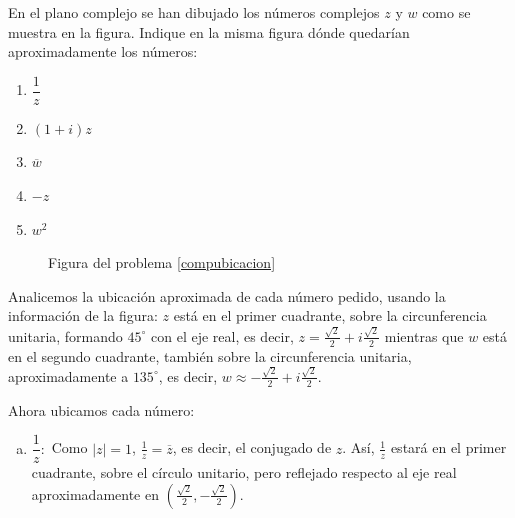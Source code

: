 \begin{prob}\label{compubicacion}
En el plano complejo se han dibujado los números complejos $z$ y $w$ como se muestra en la figura. Indique en la misma figura dónde quedarían aproximadamente los números: 


\begin{enumerate}[$a)$]
\item $\dfrac{1}{z}$
\item $(1+i)z$
\item $\overline{w}$ 
\item $-z$ 
\item $w^2$
\end{enumerate}		
		
\begin{figure}[H]
\centering
{}
\caption{Figura del problema \ref{compubicacion}}
\end{figure}
\begin{myproof}
Analicemos la ubicación aproximada de cada número pedido, usando la información de la figura: $z$ está en el primer cuadrante, sobre la circunferencia unitaria, formando $45^\circ$ con el eje real, es decir, $z = \frac{\sqrt{2}}{2} + i\frac{\sqrt{2}}{2}$ mientras que $w$ está en el segundo cuadrante, también sobre la circunferencia unitaria, aproximadamente a $135^\circ$, es decir, $w \approx -\frac{\sqrt{2}}{2} + i\frac{\sqrt{2}}{2}$.

Ahora ubicamos cada número:

\begin{enumerate}[a)]
\item $\dfrac{1}{z}:$ Como $|z|=1$, $\frac{1}{z} = \overline{z}$, es decir, el conjugado de $z$. Así, $\frac{1}{z}$ estará en el primer cuadrante, sobre el círculo unitario, pero reflejado respecto al eje real aproximadamente en $(\frac{\sqrt{2}}{2}, -\frac{\sqrt{2}}{2})$.


\end{enumerate}
\end{myproof}
\end{prob}
